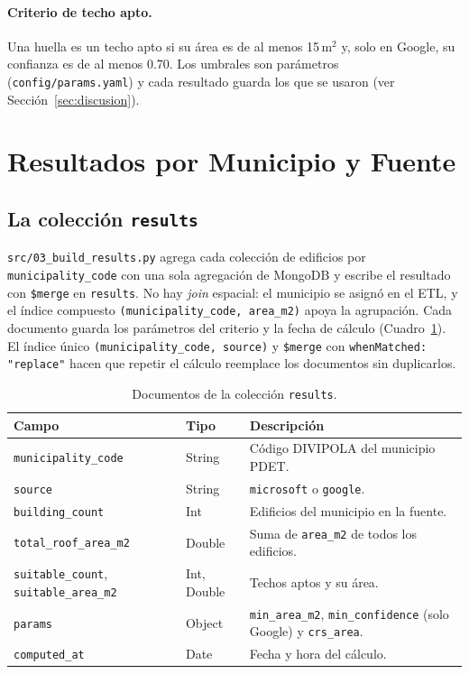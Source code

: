 \documentclass[12pt, letterpaper]{article}
\begin{document}
\paragraph{Criterio de techo apto.} Una huella es un techo apto si su área es de al menos 15\,m$^2$ y, solo en Google, su confianza es de al menos 0.70. Los umbrales son parámetros (\texttt{config/params.yaml}) y cada resultado guarda los que se usaron (ver Sección~\ref{sec:discusion}).

\section{Resultados por Municipio y Fuente}\label{sec:resultados}

\subsection{La colección \texttt{results}}
\texttt{src/03\_build\_results.py} agrega cada colección de edificios por \texttt{municipality\_code} con una sola agregación de MongoDB y escribe el resultado con \texttt{\$merge} en \texttt{results}. No hay \emph{join} espacial: el municipio se asignó en el ETL, y el índice compuesto \texttt{(municipality\_code, area\_m2)} apoya la agrupación. Cada documento guarda los parámetros del criterio y la fecha de cálculo (Cuadro~\ref{tab:dic_results}). El índice único \texttt{(municipality\_code, source)} y \texttt{\$merge} con \texttt{whenMatched: "replace"} hacen que repetir el cálculo reemplace los documentos sin duplicarlos.

\begin{table}[H]
\centering
\small
{}
\begin{tabularx}{\textwidth}{l l X}
\toprule
\textbf{Campo} & \textbf{Tipo} & \textbf{Descripción} \\
\midrule
\texttt{municipality\_code} & String & Código DIVIPOLA del municipio PDET. \\
\texttt{source} & String & \texttt{microsoft} o \texttt{google}. \\
\texttt{building\_count} & Int & Edificios del municipio en la fuente. \\
\texttt{total\_roof\_area\_m2} & Double & Suma de \texttt{area\_m2} de todos los edificios. \\
\texttt{suitable\_count}, \texttt{suitable\_area\_m2} & Int, Double & Techos aptos y su área. \\
\texttt{params} & Object & \texttt{min\_area\_m2}, \texttt{min\_confidence} (solo Google) y \texttt{crs\_area}. \\
\texttt{computed\_at} & Date & Fecha y hora del cálculo. \\
\bottomrule
\end{tabularx}
\caption{Documentos de la colección \texttt{results}.}
\label{tab:dic_results}
\end{table}
\end{document}
